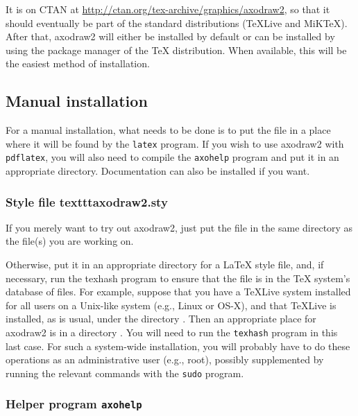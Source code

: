 \documentclass[12pt]{article}
\def\program#1{\texttt{#1}}
\begin{document}
It is on CTAN at \url{http://ctan.org/tex-archive/graphics/axodraw2},
so that it should eventually be part of the standard distributions
(TeXLive and MiKTeX).  After that, axodraw2 will either be installed
by default or can be installed by using the package manager of the
\TeX{} distribution. When available, this will be the easiest method
of installation.



\subsection{Manual installation}

For a manual installation, what needs to be done is to put
the file  in a place where it will be found by
the \program{latex} program.  If you wish to use axodraw2 with
\program{pdflatex}, you will also need to compile the \program{axohelp}
program and put it in an appropriate directory.  Documentation can
also be installed if you want.

\subsubsection{Style file texttt{axodraw2.sty}}

If you merely want to try out axodraw2, just put the file
 in the same directory as the 
file(s) you are working on. 

Otherwise, put it in an appropriate directory for a \LaTeX{} style
file, and, if necessary, run the texhash program to ensure that the
file is in the \TeX{} system's database of files.  For example,
suppose that you have a TeXLive system installed for all users on a
Unix-like system (e.g., Linux or OS-X), and that TeXLive is installed,
as is usual, under the directory .  Then an
appropriate place for axodraw2 is in a directory
.  You will
need to run the \program{texhash} program in this last case.  For such
a system-wide installation, you will probably have to do these
operations as an administrative user (e.g., root), possibly
supplemented by running the relevant commands with the \program{sudo}
program.

\subsubsection{Helper program \program{axohelp}}
\label{sec:axohelp}
\end{document}
